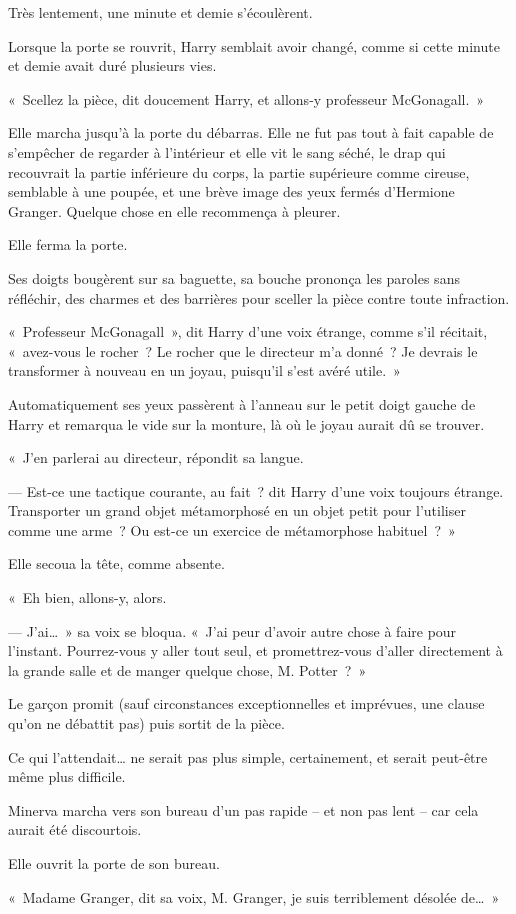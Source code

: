 Très lentement, une minute et demie s'écoulèrent.

\later

Lorsque la porte se rouvrit, Harry semblait avoir changé, comme si cette minute et demie avait duré plusieurs vies.

«~Scellez la pièce, dit doucement Harry, et allons-y professeur McGonagall.~»

Elle marcha jusqu'à la porte du débarras. Elle ne fut pas tout à fait capable de s'empêcher de regarder à l'intérieur et elle vit le sang séché, le drap qui recouvrait la partie inférieure du corps, la partie supérieure comme cireuse, semblable à une poupée, et une brève image des yeux fermés d'Hermione Granger. Quelque chose en elle recommença à pleurer.

Elle ferma la porte.

Ses doigts bougèrent sur sa baguette, sa bouche prononça les paroles sans réfléchir, des charmes et des barrières pour sceller la pièce contre toute infraction.

«~Professeur McGonagall~», dit Harry d'une voix étrange, comme s'il récitait, «~avez-vous le rocher~? Le rocher que le directeur m'a donné~? Je devrais le transformer à nouveau en un joyau, puisqu'il s'est avéré utile.~»

Automatiquement ses yeux passèrent à l'anneau sur le petit doigt gauche de Harry et remarqua le vide sur la monture, là où le joyau aurait dû se trouver.

«~J'en parlerai au directeur, répondit sa langue.

--- Est-ce une tactique courante, au fait~? dit Harry d'une voix toujours étrange. Transporter un grand objet métamorphosé en un objet petit pour l'utiliser comme une arme~? Ou est-ce un exercice de métamorphose habituel~?~»

Elle secoua la tête, comme absente.

«~Eh bien, allons-y, alors.

--- J'ai…~» sa voix se bloqua. «~J'ai peur d'avoir autre chose à faire pour l'instant. Pourrez-vous y aller tout seul, et promettrez-vous d'aller directement à la grande salle et de manger quelque chose, M. Potter~?~»

Le garçon promit (sauf circonstances exceptionnelles et imprévues, une clause qu'on ne débattit pas) puis sortit de la pièce.

Ce qui l'attendait… ne serait pas plus simple, certainement, et serait peut-être même plus difficile.

\later

Minerva marcha vers son bureau d'un pas rapide -- et non pas lent -- car cela aurait été discourtois.

Elle ouvrit la porte de son bureau.

«~Madame Granger, dit sa voix, M. Granger, je suis terriblement désolée de…~»
